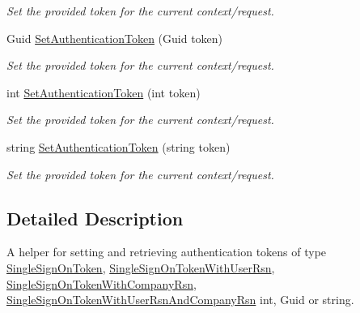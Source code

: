 \begin{DoxyCompactItemize}
\begin{DoxyCompactList}\small\item\em Set the provided {\itshape token}  for the current context/request. \end{DoxyCompactList}\item 
Guid \hyperlink{classCqrs_1_1Authentication_1_1DefaultAuthenticationTokenHelper_ad8c9ad34dde1f36073a1cf54bb82ffc5_ad8c9ad34dde1f36073a1cf54bb82ffc5}{Set\+Authentication\+Token} (Guid token)
\begin{DoxyCompactList}\small\item\em Set the provided {\itshape token}  for the current context/request. \end{DoxyCompactList}\item 
int \hyperlink{classCqrs_1_1Authentication_1_1DefaultAuthenticationTokenHelper_af1d9d9cbb1c02ca9a31b3dbd278f9a3e_af1d9d9cbb1c02ca9a31b3dbd278f9a3e}{Set\+Authentication\+Token} (int token)
\begin{DoxyCompactList}\small\item\em Set the provided {\itshape token}  for the current context/request. \end{DoxyCompactList}\item 
string \hyperlink{classCqrs_1_1Authentication_1_1DefaultAuthenticationTokenHelper_ae37a10289ec6cf99df30e1528feb0394_ae37a10289ec6cf99df30e1528feb0394}{Set\+Authentication\+Token} (string token)
\begin{DoxyCompactList}\small\item\em Set the provided {\itshape token}  for the current context/request. \end{DoxyCompactList}\end{DoxyCompactItemize}


\subsection{Detailed Description}
A helper for setting and retrieving authentication tokens of type \hyperlink{classCqrs_1_1Authentication_1_1SingleSignOnToken}{Single\+Sign\+On\+Token}, \hyperlink{classCqrs_1_1Authentication_1_1SingleSignOnTokenWithUserRsn}{Single\+Sign\+On\+Token\+With\+User\+Rsn}, \hyperlink{classCqrs_1_1Authentication_1_1SingleSignOnTokenWithCompanyRsn}{Single\+Sign\+On\+Token\+With\+Company\+Rsn}, \hyperlink{classCqrs_1_1Authentication_1_1SingleSignOnTokenWithUserRsnAndCompanyRsn}{Single\+Sign\+On\+Token\+With\+User\+Rsn\+And\+Company\+Rsn} int, Guid or string. 



